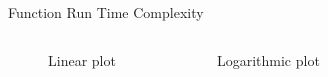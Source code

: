 \begin{frame}[label=runTimeComplexity]{Function Run Time Complexity}{}
    \begin{columns}[c]
        \begin{figure}[H]
            \caption{Linear plot}
        \end{figure}

        \begin{figure}[H]
            \caption{Logarithmic plot}
        \end{figure}
    \end{columns}
\end{frame}
